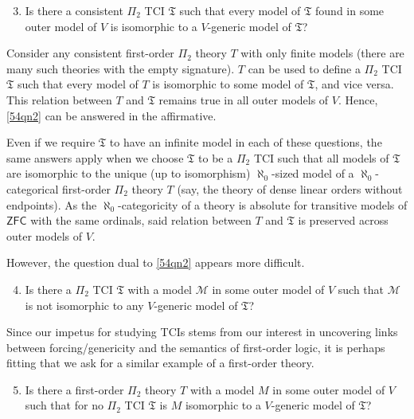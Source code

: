 \documentclass[12pt, twoside]{memoir}
\numberwithin{equation}{section}
\theoremstyle{definition}
\theoremstyle{remark}
\theoremstyle{definition}
\theoremstyle{definition}
\theoremstyle{definition}
\theoremstyle{remark}
\begin{document}
\begin{enumerate}[label=(Q\arabic*)]
    \setcounter{enumi}{2}
    \item\label{54qn2} Is there a consistent $\Pi_2$ TCI $\mathfrak{T}$ such that every model of $\mathfrak{T}$ found in some outer model of $V$ is isomorphic to a $V$-generic model of $\mathfrak{T}$?
\end{enumerate}

Consider any consistent first-order $\Pi_2$ theory $T$ with only finite models (there are many such theories with the empty signature). $T$ can be used to define a $\Pi_2$ TCI $\mathfrak{T}$ such that every model of $T$ is isomorphic to some model of $\mathfrak{T}$, and vice versa. This relation between $T$ and $\mathfrak{T}$ remains true in all outer models of $V$. Hence, \ref{54qn2} can be answered in the affirmative. 

Even if we require $\mathfrak{T}$ to have an infinite model in each of these questions, the same answers apply when we choose $\mathfrak{T}$ to be a $\Pi_2$ TCI such that all models of $\mathfrak{T}$ are isomorphic to the unique (up to isomorphism) $\aleph_0$-sized model of a $\aleph_0$-categorical first-order $\Pi_2$ theory $T$ (say, the theory of dense linear orders without endpoints). As the $\aleph_0$-categoricity of a theory is absolute for transitive models of $\mathsf{ZFC}$ with the same ordinals, said relation between $T$ and $\mathfrak{T}$ is preserved across outer models of $V$.

However, the question dual to \ref{54qn2} appears more difficult.

\begin{enumerate}[label=(Q\arabic*)]
    \setcounter{enumi}{3}
    \item\label{54qn3} Is there a $\Pi_2$ TCI $\mathfrak{T}$ with a model $\mathcal{M}$ in some outer model of $V$ such that $\mathcal{M}$ is not isomorphic to any $V$-generic model of $\mathfrak{T}$?
\end{enumerate}

Since our impetus for studying TCIs stems from our interest in uncovering links between forcing/genericity and the semantics of first-order logic, it is perhaps fitting that we ask for a similar example of a first-order theory. 

\begin{enumerate}[label=(Q\arabic*)]
    \setcounter{enumi}{4}
    \item\label{54qn4} Is there a first-order $\Pi_2$ theory $T$ with a model $M$ in some outer model of $V$ such that for no $\Pi_2$ TCI $\mathfrak{T}$ is $M$ isomorphic to a $V$-generic model of $\mathfrak{T}$?
\end{enumerate}
\end{document}

